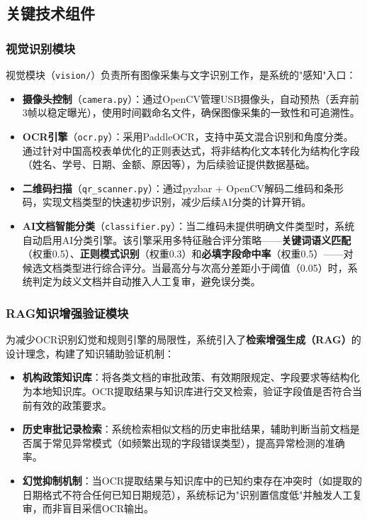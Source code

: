 \documentclass[conference]{IEEEtran}
\begin{document}
\subsection{关键技术组件}

\subsubsection{视觉识别模块}

视觉模块（\texttt{vision/}）负责所有图像采集与文字识别工作，是系统的"感知"入口：

\begin{itemize}[leftmargin=*]
    \item \textbf{摄像头控制}（\texttt{camera.py}）：通过OpenCV管理USB摄像头，自动预热（丢弃前3帧以稳定曝光），使用时间戳命名文件，确保图像采集的一致性和可追溯性。
    \item \textbf{OCR引擎}（\texttt{ocr.py}）：采用PaddleOCR，支持中英文混合识别和角度分类。通过针对中国高校表单优化的正则表达式，将非结构化文本转化为结构化字段（姓名、学号、日期、金额、原因等），为后续验证提供数据基础。
    \item \textbf{二维码扫描}（\texttt{qr\_scanner.py}）：通过pyzbar + OpenCV解码二维码和条形码，实现文档类型的快速初步识别，减少后续AI分类的计算开销。
    \item \textbf{AI文档智能分类}（\texttt{classifier.py}）：当二维码未提供明确文件类型时，系统自动启用AI分类引擎。该引擎采用多特征融合评分策略——\textbf{关键词语义匹配}（权重0.5）、\textbf{正则模式识别}（权重0.3）和\textbf{必填字段命中率}（权重0.5）——对候选文档类型进行综合评分。当最高分与次高分差距小于阈值（0.05）时，系统判定为歧义文档并自动推入人工复审，避免误分类。
\end{itemize}

\subsubsection{RAG知识增强验证模块}

为减少OCR识别幻觉和规则引擎的局限性，系统引入了\textbf{检索增强生成（RAG）}的设计理念，构建了知识辅助验证机制：

\begin{itemize}[leftmargin=*]
    \item \textbf{机构政策知识库}：将各类文档的审批政策、有效期限规定、字段要求等结构化为本地知识库。OCR提取结果与知识库进行交叉检索，验证字段值是否符合当前有效的政策要求。
    \item \textbf{历史审批记录检索}：系统检索相似文档的历史审批结果，辅助判断当前文档是否属于常见异常模式（如频繁出现的字段错误类型），提高异常检测的准确率。
    \item \textbf{幻觉抑制机制}：当OCR提取结果与知识库中的已知约束存在冲突时（如提取的日期格式不符合任何已知日期规范），系统标记为"识别置信度低"并触发人工复审，而非盲目采信OCR输出。
\end{itemize}
\end{document}
